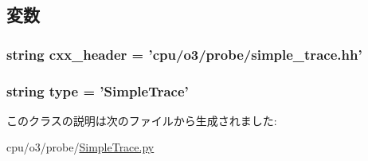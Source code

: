 \subsection{変数}
\hypertarget{classSimpleTrace_1_1SimpleTrace_a17da7064bc5c518791f0c891eff05fda}{
\subsubsection[{cxx\_\-header}]{\setlength{\rightskip}{0pt plus 5cm}string {\bf cxx\_\-header} = 'cpu/o3/probe/simple\_\-trace.hh'}}
\label{classSimpleTrace_1_1SimpleTrace_a17da7064bc5c518791f0c891eff05fda}
\hypertarget{classSimpleTrace_1_1SimpleTrace_acce15679d830831b0bbe8ebc2a60b2ca}{
\subsubsection[{type}]{\setlength{\rightskip}{0pt plus 5cm}string {\bf type} = '{\bf SimpleTrace}'}}
\label{classSimpleTrace_1_1SimpleTrace_acce15679d830831b0bbe8ebc2a60b2ca}


このクラスの説明は次のファイルから生成されました:\begin{DoxyCompactItemize}
\item 
cpu/o3/probe/\hyperlink{SimpleTrace_8py}{SimpleTrace.py}\end{DoxyCompactItemize}
